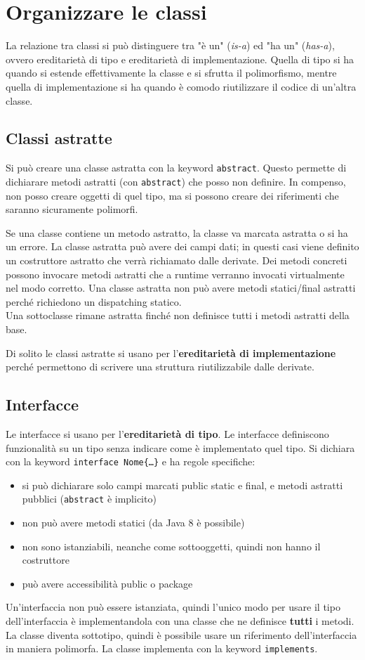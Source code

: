\chapter{Organizzare le classi}

La relazione tra classi si può distinguere tra "è un" (\textit{is-a}) ed "ha un" (\textit{has-a}), ovvero ereditarietà di tipo e ereditarietà di implementazione. Quella di tipo si ha quando si estende effettivamente la classe e si sfrutta il polimorfismo, mentre quella di implementazione si ha quando è comodo riutilizzare il codice di un'altra classe.
\section{Classi astratte}
Si può creare una classe astratta con la keyword \texttt{abstract}. Questo permette di dichiarare metodi astratti (con \texttt{abstract}) che posso non definire. In compenso, non posso creare oggetti di quel tipo, ma si possono creare dei riferimenti che saranno sicuramente polimorfi.

Se una classe contiene un metodo astratto, la classe va marcata astratta o si ha un errore.
La classe astratta può avere dei campi dati; in questi casi viene definito un costruttore astratto che verrà richiamato dalle derivate.
Dei metodi concreti possono invocare metodi astratti che a runtime verranno invocati virtualmente nel modo corretto.
Una classe astratta non può avere metodi statici/final astratti perché richiedono un dispatching statico. \\
Una sottoclasse rimane astratta finché non definisce tutti i metodi astratti della base.

Di solito le classi astratte si usano per l'\textbf{ereditarietà di implementazione} perché permettono di scrivere una struttura riutilizzabile dalle derivate.

\section{Interfacce}
Le interfacce si usano per l'\textbf{ereditarietà di tipo}. Le interfacce definiscono funzionalità su un tipo senza indicare come è implementato quel tipo. Si dichiara con la keyword \texttt{interface Nome\{…\}} e ha regole specifiche:
\begin{itemize}
\item si può dichiarare solo campi marcati public static e final, e metodi astratti pubblici (\texttt{abstract} è implicito)
\item non può avere metodi statici (da Java 8 è possibile)
\item non sono istanziabili, neanche come sottooggetti, quindi non hanno il costruttore
\item può avere accessibilità public o package
\end{itemize}
Un'interfaccia non può essere istanziata, quindi l'unico modo per usare il tipo dell'interfaccia è implementandola con una classe che ne definisce \textbf{tutti} i metodi. La classe diventa sottotipo, quindi è possibile usare un riferimento dell'interfaccia in maniera polimorfa. La classe implementa con la keyword \texttt{implements}. 

